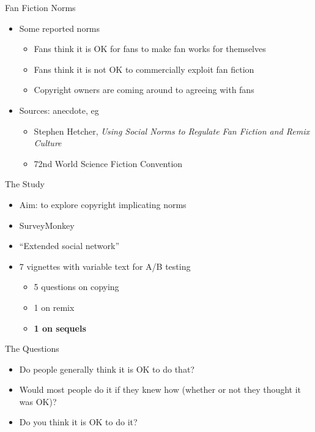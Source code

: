 \documentclass{beamer}
\begin{document}
\begin{frame}{Fan Fiction Norms}
  \begin{itemize}
  \item Some reported norms
    \begin{itemize}
    \item Fans think it is OK for fans to make fan works for themselves
    \item Fans think it is not OK to commercially exploit fan fiction
    \item Copyright owners are coming around to agreeing with fans
    \end{itemize}
  \item Sources: anecdote, eg
    \begin{itemize}
    \item Stephen Hetcher, {\it Using Social Norms to Regulate Fan Fiction and Remix Culture}
    \item 72nd World Science Fiction Convention
    \end{itemize}
  \end{itemize}
\end{frame}

\begin{frame}{The Study}
  \begin{itemize}
  \item Aim: to explore copyright implicating norms
  \item SurveyMonkey 
  \item ``Extended social network''
  \item 7 vignettes with variable text for A/B testing
    \begin{itemize}
    \item 5 questions on copying
    \item 1 on remix
    \item {\bf 1 on sequels}
    \end{itemize}
  \end{itemize}
\end{frame}

\begin{frame}{The Questions}
  \begin{itemize}
  \item Do people generally think it is OK to do that?
  \item Would most people do it if they knew how (whether or not they thought it was OK)?
  \item Do you think it is OK to do it?
  \end{itemize}

\end{frame}
\end{document}
